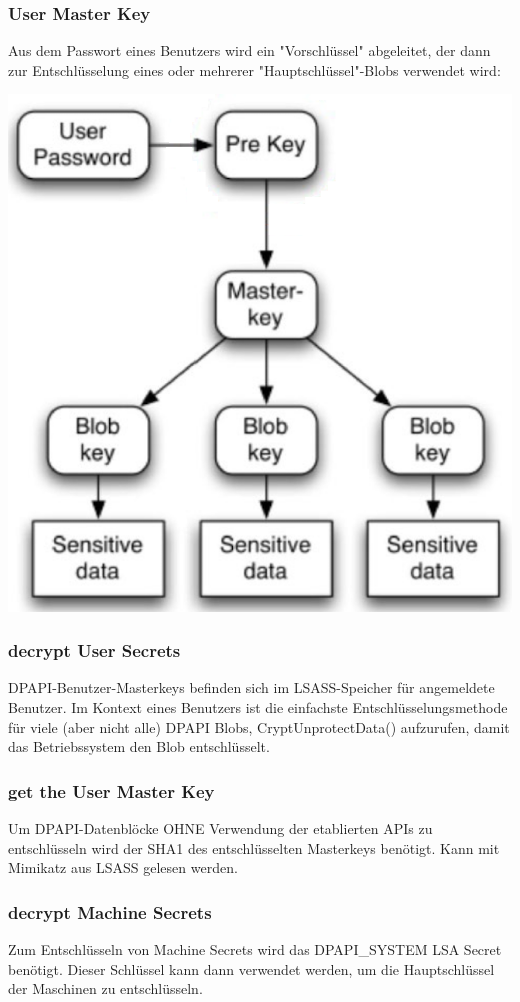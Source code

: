\subsubsection{User Master Key}
Aus dem Passwort eines Benutzers wird ein "Vorschlüssel" abgeleitet, der dann zur Entschlüsselung eines oder mehrerer "Hauptschlüssel"-Blobs verwendet wird:
\begin{center}
    \vspace{-8pt}
    \includegraphics[width=.4\linewidth]{./img/05-mimikatz/dpapi_master_key}
    \vspace{-8pt}
\end{center}

\columnbreak

\subsubsection{decrypt User Secrets}
DPAPI-Benutzer-Masterkeys befinden sich im LSASS-Speicher für angemeldete Benutzer. Im Kontext eines Benutzers ist die einfachste Entschlüsselungsmethode für viele (aber nicht alle) DPAPI Blobs, CryptUnprotectData() aufzurufen, damit das Betriebssystem den Blob entschlüsselt.

\subsubsection{get the User Master Key}
Um DPAPI-Datenblöcke OHNE Verwendung der etablierten APIs zu entschlüsseln wird der SHA1 des entschlüsselten Masterkeys benötigt. Kann mit Mimikatz aus LSASS gelesen werden.

\subsubsection{decrypt Machine Secrets}
Zum Entschlüsseln von Machine Secrets wird das DPAPI\_SYSTEM LSA Secret benötigt. Dieser Schlüssel kann dann verwendet werden, um die Hauptschlüssel der Maschinen zu entschlüsseln.

